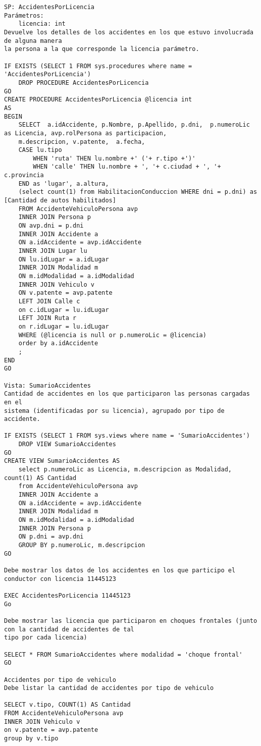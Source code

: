 {\begin{verbatim}
SP: AccidentesPorLicencia
Parámetros: 
    licencia: int 
Devuelve los detalles de los accidentes en los que estuvo involucrada de alguna manera
la persona a la que corresponde la licencia parámetro.

IF EXISTS (SELECT 1 FROM sys.procedures where name = 'AccidentesPorLicencia')
    DROP PROCEDURE AccidentesPorLicencia
GO
CREATE PROCEDURE AccidentesPorLicencia @licencia int
AS
BEGIN
    SELECT  a.idAccidente, p.Nombre, p.Apellido, p.dni,  p.numeroLic as Licencia, avp.rolPersona as participacion, 
    m.descripcion, v.patente,  a.fecha, 
	CASE lu.tipo 
		WHEN 'ruta' THEN lu.nombre +' ('+ r.tipo +')'
		WHEN 'calle' THEN lu.nombre + ', '+ c.ciudad + ', '+ c.provincia
	END as 'lugar', a.altura,
	(select count(1) from HabilitacionConduccion WHERE dni = p.dni) as [Cantidad de autos habilitados]
    FROM AccidenteVehiculoPersona avp 
    INNER JOIN Persona p
    ON avp.dni = p.dni
    INNER JOIN Accidente a
    ON a.idAccidente = avp.idAccidente
    INNER JOIN Lugar lu
    ON lu.idLugar = a.idLugar
    INNER JOIN Modalidad m
    ON m.idModalidad = a.idModalidad
    INNER JOIN Vehiculo v
	ON v.patente = avp.patente
    LEFT JOIN Calle c
	on c.idLugar = lu.idLugar
	LEFT JOIN Ruta r
	on r.idLugar = lu.idLugar
	WHERE (@licencia is null or p.numeroLic = @licencia)
    order by a.idAccidente
    ;
END
GO

Vista: SumarioAccidentes
Cantidad de accidentes en los que participaron las personas cargadas en el 
sistema (identificadas por su licencia), agrupado por tipo de accidente.

IF EXISTS (SELECT 1 FROM sys.views where name = 'SumarioAccidentes')
    DROP VIEW SumarioAccidentes
GO
CREATE VIEW SumarioAccidentes AS
    select p.numeroLic as Licencia, m.descripcion as Modalidad, count(1) AS Cantidad
    from AccidenteVehiculoPersona avp
    INNER JOIN Accidente a
    ON a.idAccidente = avp.idAccidente
    INNER JOIN Modalidad m
    ON m.idModalidad = a.idModalidad
    INNER JOIN Persona p
    ON p.dni = avp.dni
    GROUP BY p.numeroLic, m.descripcion
GO

Debe mostrar los datos de los accidentes en los que participo el conductor con licencia 11445123

EXEC AccidentesPorLicencia 11445123
Go

Debe mostrar las licencia que participaron en choques frontales (junto con la cantidad de accidentes de tal 
tipo por cada licencia)

SELECT * FROM SumarioAccidentes where modalidad = 'choque frontal'
GO

Accidentes por tipo de vehiculo
Debe listar la cantidad de accidentes por tipo de vehiculo

SELECT v.tipo, COUNT(1) AS Cantidad
FROM AccidenteVehiculoPersona avp
INNER JOIN Vehiculo v
on v.patente = avp.patente
group by v.tipo

\end{verbatim}
}
